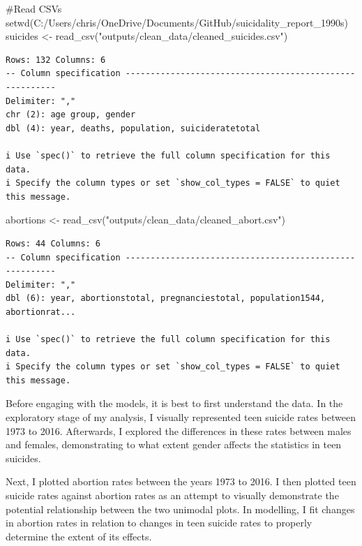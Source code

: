 \documentclass[
  letterpaper,
  DIV=11,
  numbers=noendperiod]{scrartcl}
\newenvironment{Shaded}{\begin{snugshade}}{\end{snugshade}}
\newcommand{\CommentTok}[1]{\textcolor[rgb]{0.37,0.37,0.37}{#1}}
\newcommand{\FunctionTok}[1]{\textcolor[rgb]{0.28,0.35,0.67}{#1}}
\newcommand{\NormalTok}[1]{\textcolor[rgb]{0.00,0.23,0.31}{#1}}
\newcommand{\OtherTok}[1]{\textcolor[rgb]{0.00,0.23,0.31}{#1}}
\newcommand{\StringTok}[1]{\textcolor[rgb]{0.13,0.47,0.30}{#1}}
\begin{document}
\begin{Shaded}
\begin{Highlighting}[]
\CommentTok{\#Read CSVs}
\FunctionTok{setwd}\NormalTok{(}\StringTok{\textquotesingle{}C:/Users/chris/OneDrive/Documents/GitHub/suicidality\_report\_1990s\textquotesingle{}}\NormalTok{)}
\NormalTok{suicides }\OtherTok{\textless{}{-}} \FunctionTok{read\_csv}\NormalTok{(}\StringTok{"outputs/clean\_data/cleaned\_suicides.csv"}\NormalTok{)}
\end{Highlighting}
\end{Shaded}

\begin{verbatim}
Rows: 132 Columns: 6
-- Column specification --------------------------------------------------------
Delimiter: ","
chr (2): age group, gender
dbl (4): year, deaths, population, suicideratetotal

i Use `spec()` to retrieve the full column specification for this data.
i Specify the column types or set `show_col_types = FALSE` to quiet this message.
\end{verbatim}

\begin{Shaded}
\begin{Highlighting}[]
\NormalTok{abortions }\OtherTok{\textless{}{-}} \FunctionTok{read\_csv}\NormalTok{(}\StringTok{"outputs/clean\_data/cleaned\_abort.csv"}\NormalTok{)}
\end{Highlighting}
\end{Shaded}

\begin{verbatim}
Rows: 44 Columns: 6
-- Column specification --------------------------------------------------------
Delimiter: ","
dbl (6): year, abortionstotal, pregnanciestotal, population1544, abortionrat...

i Use `spec()` to retrieve the full column specification for this data.
i Specify the column types or set `show_col_types = FALSE` to quiet this message.
\end{verbatim}

Before engaging with the models, it is best to first understand the
data. In the exploratory stage of my analysis, I visually represented
teen suicide rates between 1973 to 2016. Afterwards, I explored the
differences in these rates between males and females, demonstrating to
what extent gender affects the statistics in teen suicides.

Next, I plotted abortion rates between the years 1973 to 2016. I then
plotted teen suicide rates against abortion rates as an attempt to
visually demonstrate the potential relationship between the two unimodal
plots. In modelling, I fit changes in abortion rates in relation to
changes in teen suicide rates to properly determine the extent of its
effects.
\end{document}
